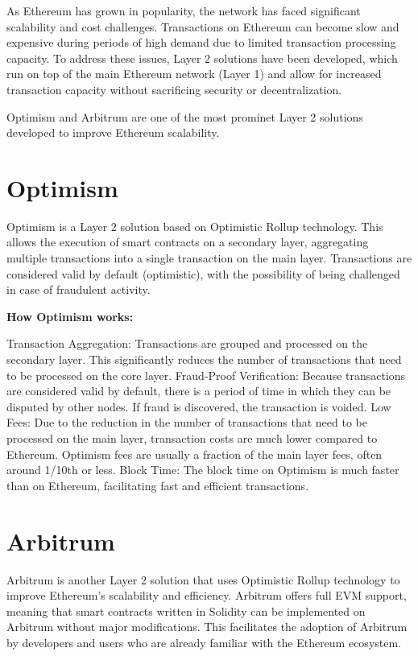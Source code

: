 As Ethereum has grown in popularity, the network has faced significant scalability and cost challenges. Transactions on Ethereum can become slow and expensive during periods of high demand due to limited transaction processing capacity. To address these issues, Layer 2 solutions have been developed, which run on top of the main Ethereum network (Layer 1) and allow for increased transaction capacity without sacrificing security or decentralization.

Optimism and Arbitrum are one of the most prominet Layer 2 solutions developed to improve Ethereum scalability.

\section{Optimism}
Optimism is a Layer 2 solution based on Optimistic Rollup technology. This allows the execution of smart contracts on a secondary layer, aggregating multiple transactions into a single transaction on the main layer. Transactions are considered valid by default (optimistic), with the possibility of being challenged in case of fraudulent activity.

\textbf{How Optimism works:}

Transaction Aggregation: Transactions are grouped and processed on the secondary layer. This significantly reduces the number of transactions that need to be processed on the core layer.
Fraud-Proof Verification: Because transactions are considered valid by default, there is a period of time in which they can be disputed by other nodes. If fraud is discovered, the transaction is voided.
Low Fees: Due to the reduction in the number of transactions that need to be processed on the main layer, transaction costs are much lower compared to Ethereum. Optimism fees are usually a fraction of the main layer fees, often around 1/10th or less.
Block Time: The block time on Optimism is much faster than on Ethereum, facilitating fast and efficient transactions.

\section{Arbitrum}
Arbitrum is another Layer 2 solution that uses Optimistic Rollup technology to improve Ethereum's scalability and efficiency. Arbitrum offers full EVM support, meaning that smart contracts written in Solidity can be implemented on Arbitrum without major modifications. This facilitates the adoption of Arbitrum by developers and users who are already familiar with the Ethereum ecosystem.

